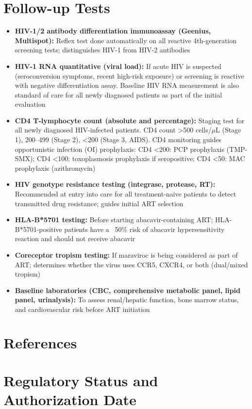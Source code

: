 \section*{Follow-up Tests}
\begin{itemize}
  \item \textbf{HIV-1/2 antibody differentiation immunoassay (Geenius, Multispot):} Reflex test done automatically on all reactive 4th-generation screening tests; distinguishes HIV-1 from HIV-2 antibodies
  \item \textbf{HIV-1 RNA quantitative (viral load):} If acute HIV is suspected (seroconversion symptoms, recent high-risk exposure) or screening is reactive with negative differentiation assay. Baseline HIV RNA measurement is also standard of care for all newly diagnosed patients as part of the initial evaluation
  \item \textbf{CD4 T-lymphocyte count (absolute and percentage):} Staging test for all newly diagnosed HIV-infected patients. CD4 count >500 cells/$\mu$L (Stage 1), 200--499 (Stage 2), <200 (Stage 3, AIDS). CD4 monitoring guides opportunistic infection (OI) prophylaxis: CD4 <200: PCP prophylaxis (TMP-SMX); CD4 <100: toxoplasmosis prophylaxis if seropositive; CD4 <50: MAC prophylaxis (azithromycin)
  \item \textbf{HIV genotype resistance testing (integrase, protease, RT):} Recommended at entry into care for all treatment-naive patients to detect transmitted drug resistance; guides initial ART selection
  \item \textbf{HLA-B*5701 testing:} Before starting abacavir-containing ART; HLA-B*5701-positive patients have a ~50\% risk of abacavir hypersensitivity reaction and should not receive abacavir
  \item \textbf{Coreceptor tropism testing:} If maraviroc is being considered as part of ART; determines whether the virus uses CCR5, CXCR4, or both (dual/mixed tropism)
  \item \textbf{Baseline laboratories (CBC, comprehensive metabolic panel, lipid panel, urinalysis):} To assess renal/hepatic function, bone marrow status, and cardiovascular risk before ART initiation
\end{itemize}

\section*{References}



\clearpage
\section*{Regulatory Status and Authorization Date}

\clearpage
